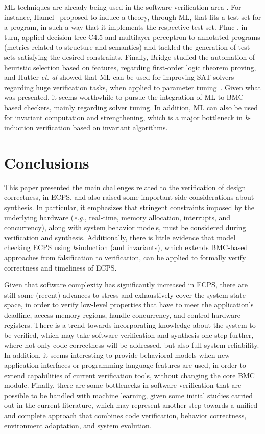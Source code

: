 \documentclass[format=acmsmall, review=false, screen=true]{acmart}
\begin{document}
{{ML techniques are already being used in the software verification area \cite{mlswverif,nguyen,bridge,babic07}. For instance, Hamel~\cite{mlswverif} proposed to induce a theory, through ML, that fits a test set for a program, in such a way that it implements the respective test set. Phuc \cite{nguyen}, in turn, applied decision tree C4.5 and multilayer perceptron to annotated programs (metrics related to structure and semantics) and tackled the generation of test sets satisfying the desired constraints. Finally, Bridge studied the automation of heuristic selection based on features, regarding first-order logic theorem proving, and Hutter {\it et. al} \cite{babic07} showed that ML can be used for improving SAT solvers regarding huge verification tasks, when applied to parameter tuning~\cite{babic07}. Given what was presented, it seems worthwhile to pursue the integration of ML to BMC-based checkers, mainly regarding solver tuning. In addition, ML can also be used for invariant computation and strengthening, which is a major bottleneck in \textit{k}-induction verification based on invariant algorithms. 

\section{Conclusions}
\label{conclusions}

This paper presented the main challenges related to the verification of design correctness, in ECPS, and also raised some important side considerations about synthesis. In particular, it emphasizes that stringent constraints imposed by the underlying hardware ({\it e.g.}, real-time, memory allocation, interrupts, and concurrency), along with system behavior models, must be considered during verification and synthesis. Additionally, there is little evidence that model checking ECPS using \textit{k}-induction (and invariants), which extends BMC-based approaches from falsification to verification, can be applied to formally verify correctness and timeliness of ECPS. 

Given that software complexity has significantly increased in ECPS, there are still some (recent) advances to stress and exhaustively cover the system state space, in order to verify low-level properties that have to meet the application's deadline, access memory regions, handle concurrency, and control hardware registers. There is a trend towards incorporating knowledge about the system to be verified, which may take software verification and synthesis one step further, where not only code correctness will be addressed, but also full system reliability. In addition, it seems interesting to provide behavioral models when new application interfaces or programming language features are used, in order to extend capabilities of current verification tools, without changing the core BMC module. Finally, there are some bottlenecks in software verification that are possible to be handled with machine learning, given some initial studies carried out in the current literature, which may represent another step towards a unified and complete approach that combines code verification, behavior correctness, environment adaptation, and system evolution.

}}
\end{document}
